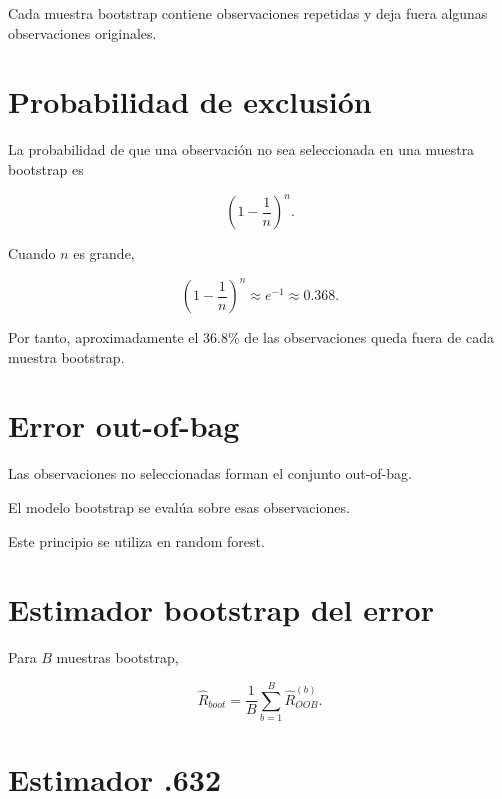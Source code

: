 \documentclass[
  spanish,
  10.5pt,
  letterpaper,
  DIV=11,
  numbers=noendperiod,
  oneside,
  open=any]{scrreprt}
\theoremstyle{definition}
\theoremstyle{definition}
\theoremstyle{plain}
\theoremstyle{remark}
\begin{document}
Cada muestra bootstrap contiene observaciones repetidas y deja fuera
algunas observaciones originales.

\section*{Probabilidad de exclusión}\label{probabilidad-de-exclusiuxf3n}


La probabilidad de que una observación no sea seleccionada en una
muestra bootstrap es

\[
\left(
1-\frac{1}{n}
\right)^n.
\]

Cuando \(n\) es grande,

\[
\left(
1-\frac{1}{n}
\right)^n
\approx
e^{-1}
\approx
0.368.
\]

Por tanto, aproximadamente el \(36.8\%\) de las observaciones queda
fuera de cada muestra bootstrap.

\section*{Error out-of-bag}\label{error-out-of-bag}


Las observaciones no seleccionadas forman el conjunto out-of-bag.

El modelo bootstrap se evalúa sobre esas observaciones.

Este principio se utiliza en random forest.

\section*{Estimador bootstrap del
error}\label{estimador-bootstrap-del-error}


Para \(B\) muestras bootstrap,

\[
\widehat{R}_{boot}
=
\frac{1}{B}
\sum_{b=1}^{B}
\widehat{R}_{OOB}^{(b)}.
\]

\section*{Estimador .632}\label{estimador-.632}
\end{document}
